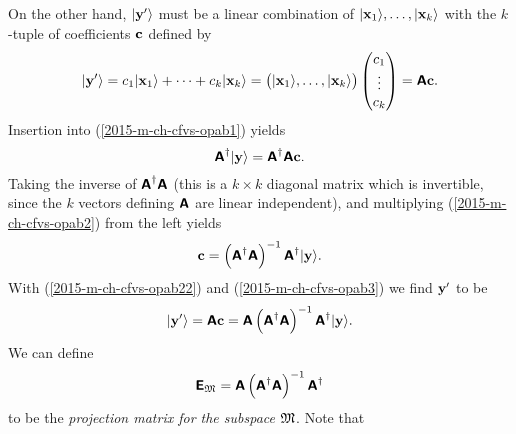 On the other hand, $\vert {\bf y}' \rangle $ must be a linear combination of
$\vert {\bf x}_1 \rangle ,\ldots ,\vert {\bf x}_k \rangle $ with the $k$-tuple of coefficients ${\bf c}$ defined by
\begin{equation}
\vert {\bf y}' \rangle
=
c_1 \vert {\bf x}_1 \rangle + \cdots + c_k \vert {\bf x}_k \rangle
=
\begin{pmatrix}\vert {\bf x}_1 \rangle, \ldots ,\vert {\bf x}_k \rangle
\end{pmatrix}
\begin{pmatrix} c_1\\ \vdots \\ c_k
\end{pmatrix}
=
\textsf{\textbf{A}}  {\bf c}
.
\label{2015-m-ch-cfvs-opab22}
\end{equation}
Insertion into (\ref{2015-m-ch-cfvs-opab1}) yields
\begin{equation}
\textsf{\textbf{A}}^\dagger  \vert {\bf y} \rangle
=
\textsf{\textbf{A}}^\dagger  \textsf{\textbf{A}} {\bf c}
.
\label{2015-m-ch-cfvs-opab2}
\end{equation}
Taking the inverse of $\textsf{\textbf{A}}^\dagger  \textsf{\textbf{A}} $
(this is a $k \times k$ diagonal matrix which is invertible, since
the $k$ vectors defining $\textsf{\textbf{A}}$ are linear independent),
and multiplying (\ref{2015-m-ch-cfvs-opab2}) from the left yields
\begin{equation}
{\bf c}
=
\left(\textsf{\textbf{A}}^\dagger  \textsf{\textbf{A}} \right)^{-1} \textsf{\textbf{A}}^\dagger\vert {\bf y} \rangle
.
\label{2015-m-ch-cfvs-opab3}
\end{equation}
With (\ref{2015-m-ch-cfvs-opab22}) and (\ref{2015-m-ch-cfvs-opab3})
we find ${\bf y}'$ to be
\begin{equation}
\vert {\bf y}' \rangle
=
\textsf{\textbf{A}}  {\bf c} =
\textsf{\textbf{A}}  \left(\textsf{\textbf{A}}^\dagger  \textsf{\textbf{A}} \right)^{-1} \textsf{\textbf{A}}^\dagger \vert {\bf y} \rangle
.
\label{2015-m-ch-cfvs-opab4}
\end{equation}
We can define
\begin{equation}
\textsf{\textbf{E}}_{{\frak M}}=
\textsf{\textbf{A}}  \left(\textsf{\textbf{A}}^\dagger  \textsf{\textbf{A}} \right)^{-1} \textsf{\textbf{A}}^\dagger
\label{2015-m-ch-cfvs-opab5}
\end{equation}
to be the {\em projection matrix for the subspace ${\frak M}$}.
Note that
